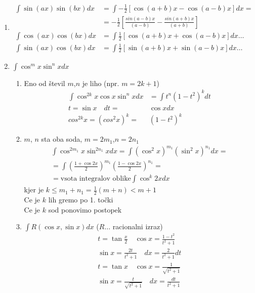 \documentclass[a4paper,oneside,10pt]{article}
\theoremstyle{definition}
\newcommand\ogl[1]{\left[#1\right]}
\newcommand\okr[1]{\left(#1\right)}
\begin{document}
\begin{multicols}{2}
\begin{enumerate}
		\item 
		\begin{align*}
			\int \sin{(ax)}\sin{(bx)} dx &= \int -\frac{1}{2}\ogl{\cos{(a+b)x} - \cos{(a-b)x}}dx =\\ 
			&=-\frac{1}{2}\ogl{\frac{sin{(a-b)x}}{(a-b)} - \frac{sin{(a+b)x}}{(a+b)}}\\
			\int \cos{(ax)}\cos{(bx)} dx &= \int \frac{1}{2}\ogl{\cos{(a+b)x} + \cos{(a-b)x}}dx \dots\\
			\int \sin{(ax)}\cos{(bx)} dx &= \int \frac{1}{2}\ogl{\sin{(a+b)x} + \sin{(a-b)x}}dx \dots
		\end{align*}
		\item $\int \cos^{m}{x}\sin^{n}{x}dx$
		\begin{enumerate}
			\item Eno od števil $m$,$n$ je liho (npr. $m = 2k + 1$)\\
			\begin{align*}
				\int \cos^{2k}{x}\cos{x}\sin^{n}{x}dx &= \int t^n (1-t^2)^k dt\\
				t = \sin{x} \quad dt =& \cos{x}dx\\
				cos^{2k}{x} = (cos^{2}{x})^k =& (1-t^2)^k
			\end{align*}
			\item $m$, $n$ sta oba soda, $m = 2m_1$,$n = 2n_1$\\
			\begin{align*}
				\int \cos^{2m_1}{x}\sin^{2n_1}{x}dx = \int (\cos^{2}{x})^{m_1}(\sin^{2}{x})^{n_1}dx=\\
				=\int \okr{\frac{1+\cos{2x}}{2}}^{m_1}\okr{\frac{1-\cos{2x}}{2}}^{n_1} =\\
				=\text{vsota integralov oblike} \int \cos^k{2x}dx
			\end{align*}
			kjer je $k \leq m_1 + n_1 = \frac{1}{2}(m+n) < m + 1$\\
			Ce je $k$ lih gremo po 1. točki\\
			Ce je $k$ sod ponovimo postopek\\
			\item $\int R(\cos{x}, \sin{x})dx$ ($R \dots$ racionalni izraz)\\
			\begin{align*}
				t  = \tan{\frac{x}{2}} \quad \cos{x} = \frac{1 - t^2}{t^2 + 1}\\
				\sin{x} = \frac{2t}{t^2 + 1} \quad dx = \frac{2}{t^2 + 1}dt\\
				t  = \tan{x} \quad \cos{x} = \frac{1}{\sqrt{t^2 + 1}}\\
				\sin{x} = \frac{t}{\sqrt{t^2 + 1}} \quad dx = \frac{dt}{t^2 + 1}\\
			\end{align*}
		\end{enumerate}					
	\end{enumerate}	
%

\end{multicols}
\end{document}
